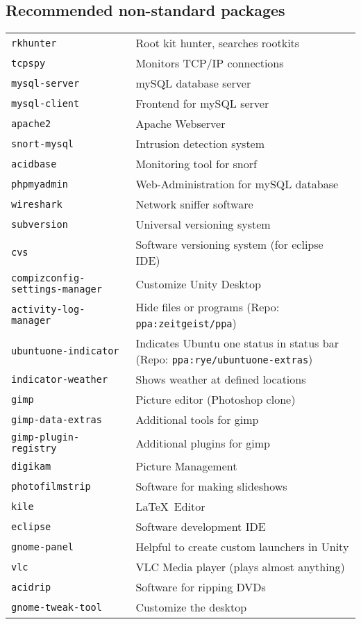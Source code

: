 \subsection{Recommended non-standard packages}
\begin{tabular}{@{}p{\the\MyLen}%
				@{}p{\linewidth-\the\MyLen}}
	\verb!rkhunter!		& Root kit hunter, searches rootkits \\
	\verb!tcpspy!		& Monitors TCP/IP connections\\
	\verb!mysql-server!	& mySQL database server\\
	\verb!mysql-client!	& Frontend for mySQL server\\
	\verb!apache2!		& Apache Webserver\\
	\verb!snort-mysql!	& Intrusion detection system\\
	\verb!acidbase!		& Monitoring tool for snorf\\
	\verb!phpmyadmin!	& Web-Administration for mySQL database\\
	\verb!wireshark!	& Network sniffer software\\
	\verb!subversion!	& Universal versioning system\\
	\verb!cvs!			& Software versioning system (for eclipse IDE)\\
	\verb!compizconfig-settings-manager! & Customize Unity Desktop\\
	\verb!activity-log-manager! & Hide files or programs (Repo: \verb!ppa:zeitgeist/ppa!)\\
	\verb!ubuntuone-indicator! & Indicates Ubuntu one status in status bar (Repo: \verb!ppa:rye/ubuntuone-extras!)\\
	\verb!indicator-weather! & Shows weather at defined locations\\
	\verb!gimp!			& Picture editor (Photoshop clone)\\
	\verb!gimp-data-extras! & Additional tools for gimp\\
	\verb!gimp-plugin-registry! & Additional plugins for gimp\\
	\verb!digikam!		& Picture Management\\
	\verb!photofilmstrip! & Software for making slideshows\\
	\verb!kile!			& \LaTeX\ Editor\\
	\verb!eclipse!		& Software development IDE\\
	\verb!gnome-panel!	& Helpful to create custom launchers in Unity\\
	\verb!vlc!			& VLC Media player (plays almost anything)\\
	\verb!acidrip!		& Software for ripping DVDs\\
	\verb!gnome-tweak-tool! & Customize the desktop\\
\end{tabular}

